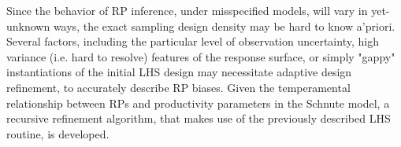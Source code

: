 \documentclass[12pt]{article}
\begin{document}
%


%
Since the behavior of RP inference, under misspecified models, will vary in 
yet-unknown ways, the exact sampling design density may be hard to know a'priori. 
Several factors, including the particular level of observation uncertainty, 
high variance (i.e. hard to resolve) features of the response surface, or 
simply "gappy" instantiations of the initial LHS design may necessitate 
adaptive design refinement, to accurately describe RP biases. Given the 
temperamental relationship between RPs and productivity parameters in the 
Schnute model, a recursive refinement algorithm, that makes use of the 
previously described LHS routine, is developed. 
\end{document}
